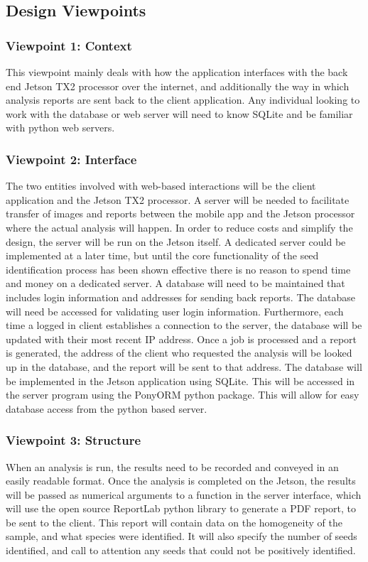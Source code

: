 \documentclass[onecolumn, draftclsnofoot,10pt, compsoc]{IEEEtran}
\begin{document}
\subsection{Design Viewpoints}

    	\subsubsection{Viewpoint 1: Context}
        	This viewpoint mainly deals with how the application interfaces with the back end Jetson TX2 processor over the internet, and additionally the way in which analysis reports are sent back to the client application. Any individual looking to work with the database or web server will need to know SQLite and be familiar with python web servers. 
        \subsubsection{Viewpoint 2: Interface}
        	The two entities involved with web-based interactions will be the client application and the Jetson TX2 processor. A server will be needed to facilitate transfer of images and reports between the mobile app and the Jetson processor where the actual analysis will happen.
            In order to reduce costs and simplify the design, the server will be run on the Jetson itself.
            A dedicated server could be implemented at a later time, but until the core functionality of the seed identification process has been shown effective there is no reason to spend time and money on a dedicated server.
            A database will need to be maintained that includes login information and addresses for sending back reports.
            The database will need be accessed for validating user login information.
            Furthermore, each time a logged in client establishes a connection to the server, the database will be updated with their most recent IP address.
            Once a job is processed and a report is generated, the address of the client who requested the analysis will be looked up in the database, and the report will be sent to that address. The database will be implemented in the Jetson application using SQLite. This will be accessed in the server program using the PonyORM python package. This will allow for easy database access from the python based server.
            
        \subsubsection{Viewpoint 3: Structure}
        	When an analysis is run, the results need to be recorded and conveyed in an easily readable format.
            Once the analysis is completed on the Jetson, the results will be passed as numerical arguments to a function in the server interface, which will use the open source ReportLab python library to generate a PDF report, to be sent to the client.
            This report will contain data on the homogeneity of the sample, and what species were identified.
            It will also specify the number of seeds identified, and call to attention any seeds that could not be positively identified.
        	
\end{document}
